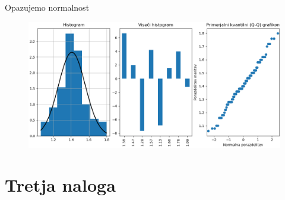 \documentclass{article}
\begin{document}
Opazujemo normalnost 
\begin{figure}[H]
    \caption{}
    \centering
    \includegraphics[scale=0.5]{2.png}
\end{figure}

\section{Tretja naloga}

\nocite{*}

{}
\end{document}
